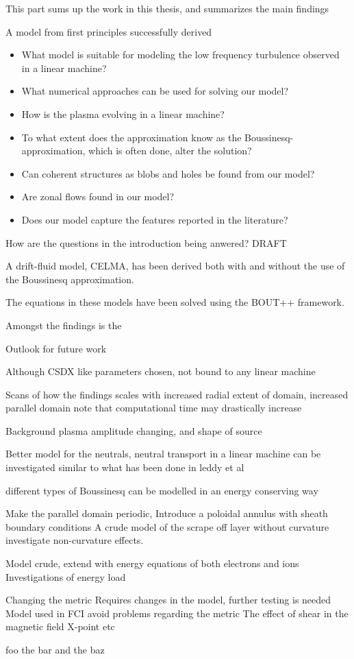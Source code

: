 %
This part sums up the work in this thesis, and summarizes the main findings

A model from first principles successfully derived


%
\begin{itemize}[noitemsep]
    \item What model is suitable for modeling the low frequency turbulence observed in a linear machine?
    \item What numerical approaches can be used for solving our model?
    \item How is the plasma evolving in a linear machine?
    \item To what extent does the approximation know as the Boussinesq-approximation, which is often done, alter the solution?
    \item Can coherent structures as blobs and holes be found from our model?
    \item Are zonal flows found in our model?
    \item Does our model capture the features reported in the literature?
\end{itemize}

How are the questions in the introduction being anwered?
DRAFT



A drift-fluid model, CELMA, has been derived both with and without the use of the Boussinesq approximation.


The equations in these models have been solved using the BOUT++ framework.


Amongst the findings is the










Outlook for future work

Although CSDX like parameters chosen, not bound to any linear machine

Scans of how the findings scales with increased radial extent of domain, increased parallel domain
note that computational time may drastically increase

Background plasma amplitude changing, and shape of source

Better model for the neutrals, neutral transport in a linear machine can be investigated
similar to what has been done in leddy et al

different types of Boussinesq
can be modelled in an energy conserving way

Make the parallel domain periodic,
Introduce a poloidal annulus with sheath boundary conditions
A crude model of the scrape off layer without curvature
investigate non-curvature effects.

Model crude, extend with energy equations of both electrons and ions
Investigations of energy load

Changing the metric
Requires changes in the model, further testing is needed
Model used in FCI avoid problems regarding the metric
The effect of shear in the magnetic field
X-point etc


foo the bar and the baz
